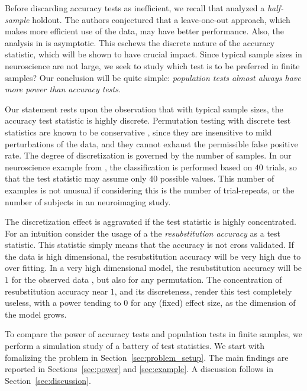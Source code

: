 \documentclass[12pt,a4paper]{article}
\theoremstyle{definition}
\begin{document}
Before discarding accuracy tests as inefficient, we recall that \cite{ramdas_classification_2016} analyzed a \emph{half-sample} holdout. 
The authors conjectured that a leave-one-out approach, which makes more efficient use of the data, may have better performance. 
Also, the analysis in \cite{ramdas_classification_2016} is asymptotic. 
This eschews the discrete nature of the accuracy statistic, which will be shown to have  crucial impact. 
Since typical sample sizes in neuroscience are not large, we seek to study which test is to be preferred in finite samples? 
Our conclusion will be quite simple: {\em population tests almost always have more power than accuracy tests}.

Our statement rests upon the observation that with typical sample sizes, the accuracy test statistic is highly discrete. 
Permutation testing with discrete test statistics are known to be conservative \citep{hemerik_exact_2014}, since they are insensitive to mild perturbations of the data, and they cannot exhaust the permissible false positive rate. 
The degree of discretization is governed by the number of samples. 
In our neuroscience example from \citet{gilron_quantifying_2016}, the classification is performed based on $40$ trials, so that the test statistic may assume only $40$ possible values. 
This number of examples is not unusual if considering this is the number of trial-repeats, or the number of subjects in an neuroimaging study. 

The discretization effect is aggravated if the test statistic is highly concentrated. 
For an intuition consider the usage of a the \emph{resubstitution accuracy} as a test statistic. 
This statistic simply means that the accuracy is not cross validated. 
If the data is high dimensional, the resubstitution accuracy will be very high due to over fitting. 
In a very high dimensional model, the resubstitution accuracy will be $1$ for the observed data \cite[Theorem 1]{mclachlan_bias_1976}, but also for any permutation.
The concentration of resubstitution accuracy near $1$, and its discreteness, render this test completely useless, with a power tending to $0$ for any (fixed) effect size, as the dimension of the model grows. 


To compare the power of accuracy tests and population tests in finite samples, we perform a simulation study of a battery of test statistics. 
We start with fomalizing the problem in Section~\ref{sec:problem_setup}.
The main findings are reported in Sections~\ref{sec:power} and \ref{sec:example}. 
A discussion follows in Section~\ref{sec:discussion}. 
\end{document}
